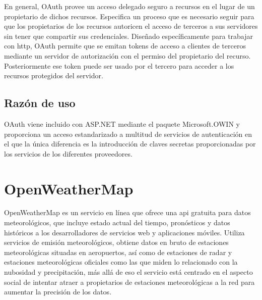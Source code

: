 \FloatBarrier

En general, OAuth provee un acceso delegado seguro a recursos en el lugar de un propietario de dichos recursos. Especifica un proceso que es necesario seguir para que los propietarios de los recursos autoricen el acceso de terceros a sus servidores sin tener que compartir sus credenciales. Diseñado específicamente para trabajar con \acrshort{http}, OAuth permite que se emitan tokens de acceso a clientes de terceros mediante un servidor de autorización con el permiso del propietario del recurso. Posteriormente ese token puede ser usado por el tercero para acceder a los recursos protegidos del servidor.

\subsection{Razón de uso}

OAuth viene incluido con ASP.NET mediante el paquete Microsoft.OWIN y proporciona un acceso estandarizado a multitud de servicios de autenticación en el que la única diferencia es la introducción de claves secretas proporcionadas por los servicios de los diferentes proveedores.



\section{OpenWeatherMap}

OpenWeatherMap\cite{OpenWeatherMap} es un servicio en línea que ofrece una \acrshort{api} gratuita para datos meteorológicos, que incluye estado actual del tiempo, pronósticos y datos históricos a los desarrolladores de servicios web y aplicaciones móviles. Utiliza servicios de emisión meteorológicos, obtiene datos en bruto de estaciones meteorológicas situadas en aeropuertos, así como de estaciones de radar y estaciones meteorológicas oficiales como las que miden lo relacionado con la nubosidad y precipitación, más allá de eso el servicio está centrado en el aspecto social de intentar atraer a propietarios de estaciones meteorológicas a la red para aumentar la precisión de los datos.


